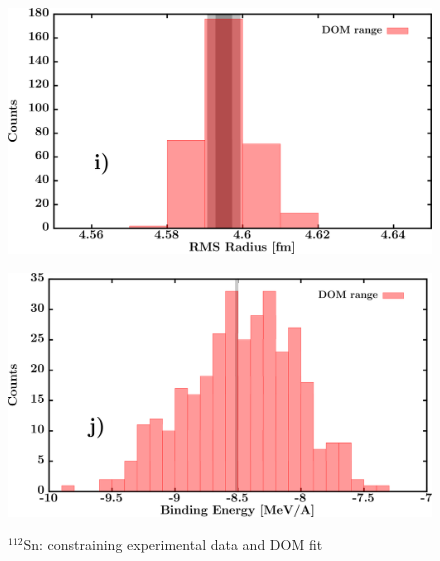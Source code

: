 \documentclass[twocolumn,secnumarabic,amssymb, nobibnotes, aps, prl,
superscriptaddress, nobalancelastpage, draft]{revtex4}
\newcommand{\snTwelve}{\ensuremath{^{112}}S\lowercase{n}}
\begin{document}
\begin{figure}[!htb]
\begin{minipage}{0.4\linewidth}
        \includegraphics[width=\linewidth]{figures/sn112_RMSRadius.png}
        \label{DOM_sn112_RMSRadius}
    \end{minipage}\hspace{6pt}
    \begin{minipage}{0.4\linewidth}
        \centering
        \includegraphics[width=\linewidth]{figures/sn112_BE.png}
        \label{DOM_sn112_BE}
    \end{minipage}
    \caption{\snTwelve: constraining experimental data and DOM fit}
    \label{DOM_sn112_structural}
\end{figure}
\end{document}
